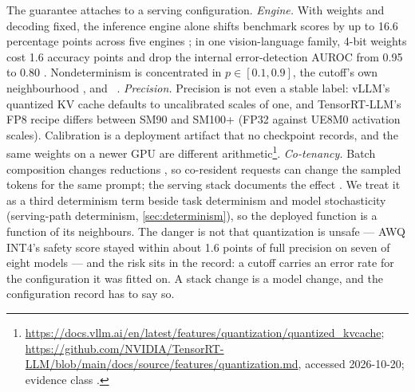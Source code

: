 The guarantee attaches to a serving configuration. \emph{Engine.} With
weights and decoding fixed, the inference engine alone shifts benchmark scores by up to 16.6
percentage points across five engines \cite{id260519537} \evindep{}; in one vision-language family,
4-bit weights cost 1.6 accuracy points and drop the internal error-detection AUROC from 0.95 to
0.80 \cite{id260724440} \evindep{}. Nondeterminism is concentrated in $p\in[0.1,0.9]$, the
cutoff's own neighbourhood \cite{id260106118}, and ~\cite{id260814376}. \emph{Precision.} Precision is not even a stable
label: vLLM's quantized KV cache defaults to uncalibrated scales of one, and TensorRT-LLM's FP8
recipe differs between SM90 and SM100+ (FP32 against UE8M0 activation scales). Calibration is a
deployment artifact that no checkpoint records, and the same weights on a newer GPU are different
arithmetic\footnote{%
\url{https://docs.vllm.ai/en/latest/features/quantization/quantized_kvcache};
\url{https://github.com/NVIDIA/TensorRT-LLM/blob/main/docs/source/features/quantization.md},
accessed 2026-10-20; evidence class \evvendor{}.}. \emph{Co-tenancy.} Batch composition changes
reductions \cite{id260106118} \evindep{}, so co-resident requests can change the sampled tokens for
the same prompt; the serving stack documents the effect \cite{vllmfaq2026} \evvendor{}. We treat it
as a third determinism term beside task determinism and model stochasticity (serving-path
determinism, \cref{sec:determinism}), so the deployed function is a function of its neighbours.
The danger is not that quantization is unsafe --- AWQ INT4's safety score stayed within
about 1.6 points of full precision on seven of eight models \cite{id260629581} \evindep{} --- and
the risk sits in the record: a cutoff carries an error rate for the configuration it was fitted on. A
stack change is a model change, and the configuration record has to say so.

